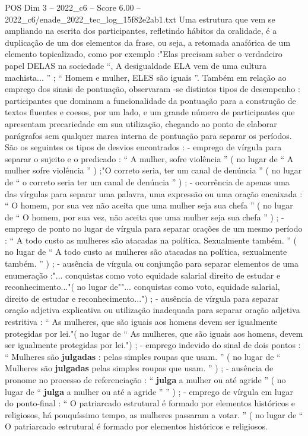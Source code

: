 \begin{textsample}{POS Dim 3 – 2022\_c6 – Score 6.00 – 2022\_c6/enade\_2022\_tec\_log\_15f82e2ab1.txt}
Uma estrutura que vem se ampliando na escrita dos participantes, refletindo hábitos da oralidade, é a duplicação de um dos elementos da frase, ou seja, a retomada anafórica de um elemento topicalizado, como por exemplo :"Elas precisam saber o verdadeiro papel DELAS na sociedade “, A desigualdade ELA vem de uma cultura machista... ” ; “ Homem e mulher, ELES são iguais ”.
Também em relação ao emprego dos sinais de pontuação, observaram -se distintos tipos de desempenho : participantes que dominam a funcionalidade da pontuação para a construção de textos fluentes e coesos, por um lado, e um grande número de participantes que apresentam precariedade em sua utilização, chegando ao ponto de elaborar parágrafos sem qualquer marca interna de pontuação para separar os períodos.
São os seguintes os tipos de desvios encontrados : - emprego de vírgula para separar o sujeito e o predicado : “ A mulher, sofre violência ” ( no lugar de “ A mulher sofre violência ” ) ;"O correto seria, ter um canal de denúncia ” ( no lugar de “ o correto seria ter um canal de denúncia ” ) ; - ocorrência de apenas uma das vírgulas para separar uma palavra, uma expressão ou uma oração encaixada : “ O homem, por sua vez não aceita que uma mulher seja sua chefa ” ( no lugar de “ O homem, por sua vez, não aceita que uma mulher seja sua chefa ” ) ; - emprego de ponto no lugar de vírgula para separar orações de um mesmo período : “ A todo custo as mulheres são atacadas na política.
Sexualmente também. ” ( no lugar de “ A todo custo as mulheres são atacadas na política, sexualmente também. ” ) ; - ausência de vírgula ou conjunção para separar elementos de uma enumeração :"... conquistas como voto equidade salarial direito de estudar e reconhecimento..."( no lugar de""... conquistas como voto, equidade salarial, direito de estudar e reconhecimento...") ; - ausência de vírgula para separar oração adjetiva explicativa ou utilização inadequada para separar oração adjetiva restritiva : “ As mulheres, que são iguais aos homens devem ser igualmente protegidas por lei."( no lugar de “ As mulheres, que são iguais aos homens, devem ser igualmente protegidas por lei.") ; - emprego indevido do sinal de dois pontos : “ Mulheres são \textbf{julgadas} : pelas simples roupas que usam. ” ( no lugar de “ Mulheres são \textbf{julgadas} pelas simples roupas que usam. ” ) ; - ausência de pronome no processo de referenciação : “ \textbf{julga} a mulher ou até agride ” ( no lugar de “ \textbf{julga} a mulher ou até a agride ” ” ) ; - emprego de vírgula em lugar do ponto-final : “ O patriarcado estrutural é formado por elementos históricos e religiosos, há pouquíssimo tempo, as mulheres passaram a votar. ” ( no lugar de “ O patriarcado estrutural é formado por elementos históricos e religiosos.

\end{textsample}

